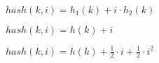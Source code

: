 \documentclass{article}
\begin{document}
$hash(k,i) = h_1(k)+i\cdot h_2(k)$
\pagebreak

$hash(k,i) = h(k)+i$
\pagebreak

$hash(k,i) = h(k)+\frac{1}{2}\cdot i+\frac{1}{2}\cdot i^2$
\pagebreak
\end{document}
